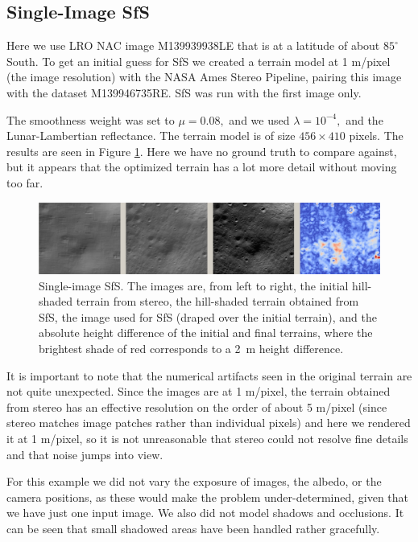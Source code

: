 \documentclass[12pt,oneside]{article}
\begin{document}
\subsection{Single-Image SfS}
\label{single}

Here we use LRO NAC image M139939938LE that is at a latitude of about
$85^\circ$ South. To get an initial guess for SfS we created a terrain
model at 1 m/pixel (the image resolution) with the NASA Ames Stereo
Pipeline, pairing this image with the dataset M139946735RE. SfS was run
with the first image only.

The smoothness weight was set to $\mu=0.08,$ and we used
$\lambda=10^{-4},$ and the Lunar-Lambertian reflectance. The terrain
model is of size $456 \times 410$ pixels. The results are seen in Figure
\ref{fig:sfs1}.  Here we have no ground truth to compare against, but it
appears that the optimized terrain has a lot more detail without moving
too far.

\begin{figure}[h!]
\begin{center}
\includegraphics[width=6in]{figures/sfs1.jpg}
\caption[sfs]{Single-image SfS. The images are, from left to right, the
  initial hill-shaded terrain from stereo, the hill-shaded terrain obtained from
  SfS, the image used for SfS (draped over the initial terrain), and the
  absolute height difference of the initial and final terrains, where
  the brightest shade of red corresponds to a 2~m height
  difference.}
\label{fig:sfs1}
\end{center}
\end{figure}

It is important to note that the numerical artifacts seen in the
original terrain are not quite unexpected. Since the images are at 1
m/pixel, the terrain obtained from stereo has an effective
resolution on the order of about 5 m/pixel (since stereo matches
image patches rather than individual pixels) and here we rendered it at
1 m/pixel, so it is not unreasonable that stereo could not resolve
fine details and that noise jumps into view. 


For this example we did not vary the exposure of images, the albedo, or
the camera positions, as these would make the problem under-determined,
given that we have just one input image.  We also did not model shadows
and occlusions. It can be seen that small shadowed areas have been
handled rather gracefully.
\end{document}
